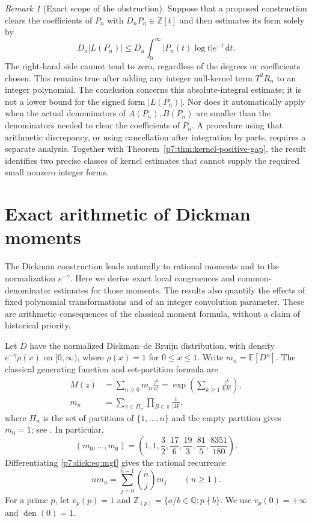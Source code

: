 \documentclass[11pt,a4paper]{article}
\theoremstyle{definition}
\theoremstyle{remark}
\newtheorem{remark}[theorem]{Remark}
\newcommand{\Q}{\mathbb Q}
\newcommand{\Z}{\mathbb Z}
\newcommand{\dd}{\,\mathrm d}
\DeclareMathOperator{\den}{den}
\numberwithin{equation}{section}
\begin{document}
\begin{remark}[Exact scope of the obstruction]\label{p7:rem:kernel-absolute-scope}
Suppose that a proposed construction clears the coefficients of $P_n$
with $D_nP_n\in\Z[t]$ and then estimates its form solely by
\[
 D_n|L(P_n)|\leq
 D_n\int_0^\infty|P_n(t)\log t|e^{-t}\dd t.
\]
The right-hand side cannot tend to zero, regardless of the degrees or
coefficients chosen.  This remains true after adding any integer
null-kernel term $T^2R_n$ to an integer polynomial.
The conclusion concerns this absolute-integral estimate; it is not a
lower bound for the signed form $|L(P_n)|$.
Nor does it automatically apply when the actual denominators of
$A(P_n),B(P_n)$ are smaller than the denominators needed to clear the
coefficients of $P_n$.  A procedure using that arithmetic discrepancy,
or using cancellation after integration by parts, requires a separate
analysis.  Together with Theorem~\ref{p7:thm:kernel-positive-gap}, the result
identifies two precise classes of kernel estimates that cannot supply
the required small nonzero integer forms.
\end{remark}


\section{Exact arithmetic of Dickman moments}
\label{p7:sec:dickman-arithmetic}
\label{p7:sec:dickman}

The Dickman construction leads naturally to rational moments and to the
normalization $e^{-\gamma}$.  Here we derive exact local congruences and
common-denominator estimates for those moments.  The results also quantify
the effects of fixed polynomial transformations and of an integer convolution
parameter.  These are arithmetic consequences of the classical moment
formula, without a claim of historical priority.

Let $D$ have the normalized Dickman--de Bruijn distribution, with density
$e^{-\gamma}\rho(x)$ on $[0,\infty)$, where $\rho(x)=1$ for $0\le x\le1$.
Write $m_n=\mathbb E[D^n]$.  The classical generating function and
set-partition formula are
\begin{align}
 M(z)&=\sum_{n\ge0}m_n\frac{z^n}{n!}
       =\exp\left(\sum_{k\ge1}\frac{z^k}{k\,k!}\right),
       \label{p7:dick:eq:mgf}\\
 m_n&=\sum_{\pi\in\Pi_n}\prod_{B\in\pi}\frac1{|B|},
       \label{p7:dick:eq:partitions}
\end{align}
where $\Pi_n$ is the set of partitions of $\{1,\ldots,n\}$ and the empty
partition gives $m_0=1$; see \cite[pp.~257--258]{p7:CellarosiSinai2011}.
In particular,
\[
 (m_0,\ldots,m_6)
 =\left(1,1,\frac32,\frac{17}6,\frac{19}3,\frac{81}5,
                \frac{8351}{180}\right).
\]
Differentiating \eqref{p7:dick:eq:mgf} gives the rational recurrence
\begin{equation}\label{p7:dick:eq:recurrence}
 n m_n=\sum_{j=0}^{n-1}\binom nj m_j\qquad(n\ge1).
\end{equation}
For a prime $p$, let $v_p(p)=1$ and
$\Z_{(p)}=\{a/b\in\Q:p\nmid b\}$.  We use $v_p(0)=+\infty$ and
$\den(0)=1$.
\end{document}
